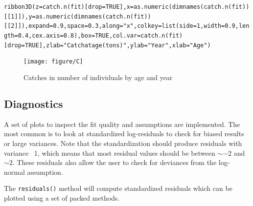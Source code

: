 \documentclass[a4paper,english,10pt]{article}\usepackage[]{graphicx}\usepackage[]{color}
\makeatletter
\newcommand{\hlnum}[1]{\textcolor[rgb]{0.2,0.2,0.2}{#1}}%
\newcommand{\hlstr}[1]{\textcolor[rgb]{0.2,0.2,0.2}{#1}}%
\newcommand{\hlstd}[1]{\textcolor[rgb]{0,0,0}{#1}}%
\newcommand{\hlkwc}[1]{\textcolor[rgb]{0.361,0.506,0.596}{#1}}%
\newcommand{\hlkwd}[1]{\textcolor[rgb]{0.361,0.506,0.596}{#1}}%
\newenvironment{kframe}{%
 \def\at@end@of@kframe{}%
 \ifinner\ifhmode%
  \def\at@end@of@kframe{\end{minipage}}%
  \begin{minipage}{\columnwidth}%
 \fi\fi%
 \def\FrameCommand##1{\hskip\@totalleftmargin \hskip-\fboxsep
 \colorbox{shadecolor}{##1}\hskip-\fboxsep
     \hskip-\linewidth \hskip-\@totalleftmargin \hskip\columnwidth}%
 \MakeFramed {\advance\hsize-\width
   \@totalleftmargin\z@ \linewidth\hsize
   \@setminipage}}%
 {\par\unskip\endMakeFramed%
 \at@end@of@kframe}
\newenvironment{knitrout}{}{} %
\newcommand{\code}[1]{{\texttt{#1}}}
\makeatother
\begin{document}
\begin{knitrout}
\color{fgcolor}\begin{kframe}
\begin{alltt}
\hlkwd{ribbon3D}\hlstd{(} \hlkwc{z} \hlstd{=} \hlkwd{catch.n}\hlstd{(fit)[}\hlkwc{drop}\hlstd{=}\hlnum{TRUE}\hlstd{],} \hlkwc{x}\hlstd{=} \hlkwd{as.numeric}\hlstd{(}\hlkwd{dimnames}\hlstd{(}\hlkwd{catch.n}\hlstd{(fit))[[}\hlnum{1}\hlstd{]]),} \hlkwc{y}\hlstd{=} \hlkwd{as.numeric}\hlstd{(}\hlkwd{dimnames}\hlstd{(}\hlkwd{catch.n}\hlstd{(fit))[[}\hlnum{2}\hlstd{]]) ,} \hlkwc{expand} \hlstd{=} \hlnum{0.9}\hlstd{,} \hlkwc{space} \hlstd{=} \hlnum{0.3}\hlstd{,} \hlkwc{along} \hlstd{=} \hlstr{"x"}\hlstd{,} \hlkwc{colkey} \hlstd{=} \hlkwd{list}\hlstd{(} \hlkwc{side}\hlstd{=}\hlnum{1}\hlstd{,} \hlkwc{width} \hlstd{=} \hlnum{0.9}\hlstd{,} \hlkwc{length} \hlstd{=} \hlnum{0.4}\hlstd{,} \hlkwc{cex.axis} \hlstd{=} \hlnum{0.8}\hlstd{),}\hlkwc{box} \hlstd{=} \hlnum{TRUE}\hlstd{,} \hlkwc{col.var}\hlstd{=}\hlkwd{catch.n}\hlstd{(fit)[}\hlkwc{drop}\hlstd{=}\hlnum{TRUE}\hlstd{] ,} \hlkwc{zlab}\hlstd{=}\hlstr{"Catch at age (tons)"}\hlstd{,} \hlkwc{ylab}\hlstd{=}\hlstr{"Year"}\hlstd{,} \hlkwc{xlab}\hlstd{=}\hlstr{"Age"}\hlstd{)}
\end{alltt}
\end{kframe}\begin{figure}[H]


{\centering \texttt{[image: figure/C]} 

}

\caption[Catches in number of individuals by age and year]{Catches in number of individuals by age and year\label{fig:C}}
\end{figure}


\end{knitrout}

\subsection{Diagnostics}

A set of plots to inspect the fit quality and assumptions are implemented. The most common is to look at standardized log-residuals to check for biased results or large variances. Note that the standardization should produce residuals with variance ~1, which means that most residual values should be between $\sim -2$ and $\sim 2$. These residuals also allow the user to check for deviances from the log-normal assumption.

The \code{residuals()} method will compute standardized residuals which can be plotted using a set of packed methods.
\end{document}
